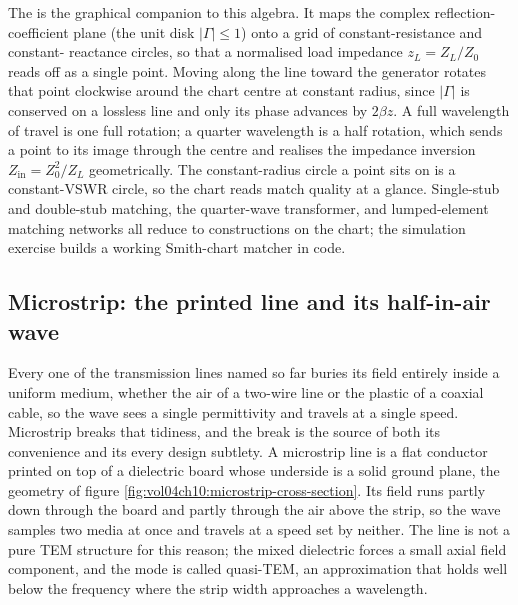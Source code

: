 The  is the graphical companion to this algebra.
It maps the complex reflection-coefficient plane (the unit disk
$|\Gamma|\le 1$) onto a grid of constant-resistance and constant-
reactance circles, so that a normalised load impedance $z_{L} =
Z_{L}/Z_{0}$ reads off as a single point. Moving along the line toward
the generator rotates that point clockwise around the chart centre at
constant radius, since $|\Gamma|$ is conserved on a lossless line and
only its phase advances by $2\beta z$. A full wavelength of travel is
one full rotation; a quarter wavelength is a half rotation, which sends
a point to its image through the centre and realises the impedance
inversion $Z_{\text{in}} = Z_{0}^{2}/Z_{L}$ geometrically. The
constant-radius circle a point sits on is a constant-VSWR circle, so the
chart reads match quality at a glance. Single-stub and double-stub
matching, the quarter-wave transformer, and lumped-element matching
networks all reduce to constructions on the chart; the simulation
exercise builds a working Smith-chart matcher in code.

\subsection{Microstrip: the printed line and its half-in-air wave}

Every one of the transmission lines named so far buries its field entirely
inside a uniform medium, whether the air of a two-wire line or the plastic
of a coaxial cable, so the wave sees a single permittivity and travels at a
single speed. Microstrip breaks that tidiness, and the break is the source
of both its convenience and its every design subtlety. A microstrip line is
a flat conductor printed on top of a dielectric board whose underside is a
solid ground plane, the geometry of figure
\ref{fig:vol04ch10:microstrip-cross-section}. Its field runs partly down
through the board and partly through the air above the strip, so the wave
samples two media at once and travels at a speed set by neither. The line
is not a pure TEM structure for this reason; the mixed dielectric forces a
small axial field component, and the mode is called quasi-TEM, an
approximation that holds well below the frequency where the strip width
approaches a wavelength.



